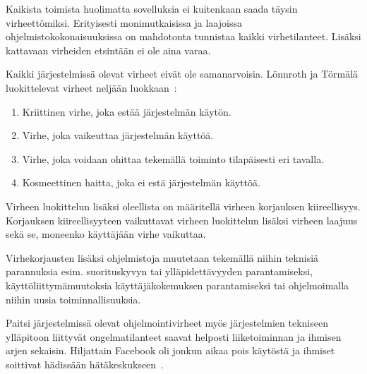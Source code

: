\documentclass[finnish]{tktltiki2}
\theoremstyle{definition}
\theoremstyle{remark}
\begin{document}
Kaikista toimista huolimatta sovelluksia ei kuitenkaan saada täysin virheettömiksi. Erityisesti monimutkaisissa ja laajoissa ohjelmistokokonaisuuksissa on mahdotonta tunnistaa kaikki virhetilanteet. Lisäksi kattavaan virheiden etsintään ei ole aina varaa.

Kaikki järjestelmissä olevat virheet eivät ole samanarvoisia. Lönnroth ja Törmälä luokittelevat virheet neljään luokkaan~\cite{testaus-kriittisyys}:
\begin{enumerate}
  \item Kriittinen virhe, joka estää järjestelmän käytön.
  \item Virhe, joka vaikeuttaa järjestelmän käyttöä.
  \item Virhe, joka voidaan ohittaa tekemällä toiminto tilapäisesti eri tavalla.
  \item Kosmeettinen haitta, joka ei estä järjestelmän käyttöä.
\end{enumerate}

Virheen luokittelun lisäksi oleellista on määritellä virheen korjauksen kiireellisyys. Korjauksen kiireellisyyteen vaikuttavat virheen luokittelun lisäksi virheen laajuus sekä se, moneenko käyttäjään virhe vaikuttaa.


Virhekorjausten lisäksi ohjelmistoja muutetaan tekemällä niihin teknisiä parannuksia esim. suorituskyvyn tai ylläpidettävyyden parantamiseksi, käyttöliittymämuutoksia käyttäjäkokemuksen parantamiseksi tai ohjelmoimalla niihin uusia toiminnallisuuksia.

Paitsi järjestelmissä olevat ohjelmointivirheet myös järjestelmien tekniseen ylläpitoon liittyvät ongelmatilanteet saavat helposti liiketoiminnan ja ihmisen arjen sekaisin. Hiljattain Facebook oli jonkun aikaa pois käytöstä ja ihmiset soittivat hädissään hätäkeskukseen~\cite{facebook-down}.
\end{document}
